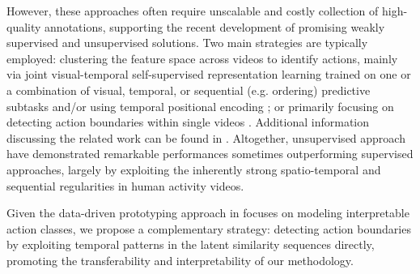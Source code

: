 
    However, these approaches often require unscalable and costly collection of high-quality annotations, supporting the recent development of promising weakly supervised and unsupervised solutions. Two main strategies are typically employed: clustering the feature space across videos to identify actions, mainly via joint visual-temporal self-supervised representation learning trained on one or a combination of visual, temporal, or sequential (e.g. ordering) predictive subtasks \cite{https://doi.org/10.48550/arxiv.2001.11122, 9157452, https://doi.org/10.48550/arxiv.1904.04189, Bojanowski2014} and/or using temporal positional encoding \cite{deAPMarques2022, retrocausal}; or primarily focusing on detecting action boundaries within single videos \cite{9879786, twfinch, 990935}. Additional information discussing the related work can be found in . Altogether, unsupervised approach have demonstrated remarkable performances sometimes outperforming supervised approaches, largely by exploiting the inherently strong spatio-temporal and sequential regularities in human activity videos. 

    Given the data-driven prototyping approach in  focuses on modeling interpretable action classes, we propose a complementary strategy: detecting action boundaries by exploiting temporal patterns in the latent similarity sequences directly, promoting the transferability and interpretability of our methodology.                 

